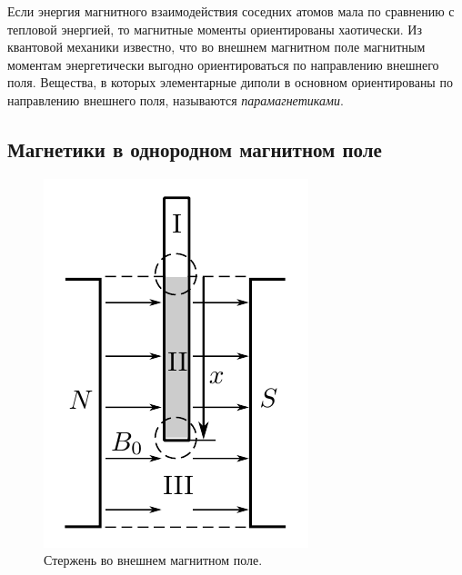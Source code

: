 \documentclass[12pt,a4paper]{article}
\begin{document}
	Если энергия магнитного взаимодействия соседних атомов мала по сравнению с тепловой энергией, то магнитные моменты ориентированы хаотически. Из квантовой механики известно, что во внешнем магнитном поле магнитным моментам энергетически выгодно ориентироваться по направлению внешнего поля. Вещества, в которых элементарные диполи в основном ориентированы по направлению внешнего поля, называются \textit{парамагнетиками}.
	
	\subsection*{Магнетики в однородном магнитном поле}
	\begin{figure}
		\includegraphics[width=\linewidth]{res/rod.png}
		\caption{Стержень во внешнем магнитном поле.}
		\label{img:rod}
	\end{figure}
	
\end{document}
